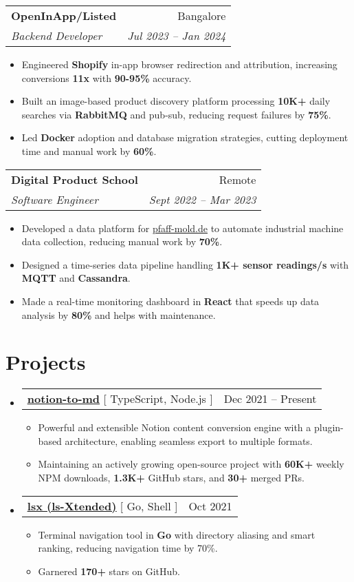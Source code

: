 \documentclass[letterpaper,11pt]{article}
\makeatletter
\newcommand{\resumeItem}[1]{
  \item\small{
    {#1 \vspace{-2pt}}
  }
}
\newcommand{\resumeLink}[2]{%
  \href{#1}{\underline{#2}}%
}
\newcommand{\resumeSubheading}[4]{
  \vspace{-2pt}\item
    \begin{tabular*}{0.97\textwidth}[t]{l@{\extracolsep{\fill}}r}
      \textbf{#1} & #2 \\
      \textit{\small#3} & \textit{\small #4} \\
    \end{tabular*}\vspace{-5pt}
}
\newcommand{\resumeProjectHeading}[2]{
    \item
    \begin{tabular*}{0.97\textwidth}{l@{\extracolsep{\fill}}r}
      \small#1 & #2 \\
    \end{tabular*}\vspace{-7pt}
}
\newcommand{\resumeSubHeadingListStart}{\begin{itemize}[leftmargin=0.15in, label={}]}
\newcommand{\resumeSubHeadingListEnd}{\end{itemize}}
\newcommand{\resumeItemListStart}{\begin{itemize}}
\newcommand{\resumeItemListEnd}{\end{itemize}\vspace{-5pt}}
\makeatother
\begin{document}
\resumeSubheading
{OpenInApp/Listed}{Bangalore}
{Backend Developer}{Jul 2023 -- Jan 2024}
\resumeItemListStart
\resumeItem{Engineered \textbf{Shopify} in-app browser redirection and attribution, increasing conversions \textbf{11x} with \textbf{90-95\%} accuracy.}
\resumeItem{Built an image-based product discovery platform processing \textbf{10K+} daily searches via \textbf{RabbitMQ} and pub-sub, reducing request failures by \textbf{75\%}.}
\resumeItem{Led \textbf{Docker} adoption and database migration strategies, cutting deployment time and manual work by \textbf{60\%}.}
\resumeItemListEnd

\resumeSubheading
{Digital Product School}{Remote}
{Software Engineer}{Sept 2022 -- Mar 2023}
\resumeItemListStart
\resumeItem{Developed a data platform for \resumeLink{https://pfaff-mold.de}{pfaff-mold.de} to automate industrial machine data collection, reducing manual work by \textbf{70\%}.}
\resumeItem{Designed a time-series data pipeline handling \textbf{1K+ sensor readings/s} with \textbf{MQTT} and \textbf{Cassandra}.}
\resumeItem{Made a real-time monitoring dashboard in \textbf{React} that speeds up data analysis by \textbf{80\%} and helps with maintenance.}
\resumeItemListEnd


\section{Projects}
\resumeSubHeadingListStart
              
\resumeProjectHeading
{\textbf{\resumeLink{https://github.com/souvikinator/notion-to-md}{notion-to-md}} {[ TypeScript, Node.js ]}}{Dec 2021 -- Present}
\resumeItemListStart
\resumeItem{Powerful and extensible Notion content conversion engine with a plugin-based architecture, enabling seamless export to multiple formats.}
\resumeItem{Maintaining an actively growing open-source project with \textbf{60K+} weekly NPM downloads, \textbf{1.3K+} GitHub stars, and \textbf{30+} merged PRs.}
\resumeItemListEnd

\resumeProjectHeading  
{\textbf{\resumeLink{https://github.com/souvikinator/lsx}{lsx (ls-Xtended)}} {[ Go, Shell ]}}{Oct 2021}
\resumeItemListStart
\resumeItem{Terminal navigation tool in \textbf{Go} with directory aliasing and smart ranking, reducing navigation time by 70\%.}
\resumeItem{Garnered \textbf{170+} stars on GitHub.}
\resumeItemListEnd
\resumeSubHeadingListEnd

\end{document}
